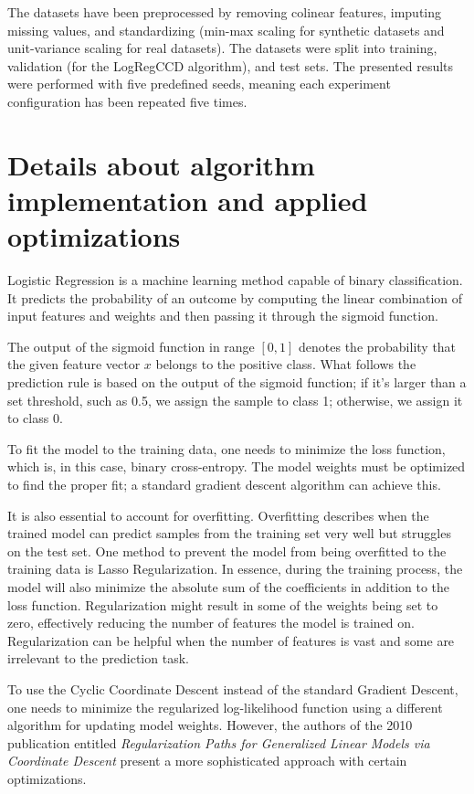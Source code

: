\documentclass[11pt]{article}
\begin{document}
The datasets have been preprocessed by removing colinear features, imputing missing values, and standardizing (min-max scaling for synthetic datasets and unit-variance scaling for real datasets). The datasets were split into training, validation (for the LogRegCCD algorithm), and test sets. The presented results were performed with five predefined seeds, meaning each experiment configuration has been repeated five times.


\section{Details about algorithm implementation and applied optimizations}

Logistic Regression is a machine learning method capable of binary classification. It predicts the probability of an outcome by computing the linear combination of input features and weights and then passing it through the sigmoid function.

The output of the sigmoid function in range $[0,1]$ denotes the probability that the given feature vector $x$ belongs to the positive class. What follows the prediction rule is based on the output of the sigmoid function; if it's larger than a set threshold, such as 0.5, we assign the sample to class 1; otherwise, we assign it to class 0.

To fit the model to the training data, one needs to minimize the loss function, which is, in this case, binary cross-entropy. The model weights must be optimized to find the proper fit; a standard gradient descent algorithm can achieve this.

It is also essential to account for overfitting. Overfitting describes when the trained model can predict samples from the training set very well but struggles on the test set. One method to prevent the model from being overfitted to the training data is Lasso Regularization. In essence, during the training process, the model will also minimize the absolute sum of the coefficients in addition to the loss function. Regularization might result in some of the weights being set to zero, effectively reducing the number of features the model is trained on. Regularization can be helpful when the number of features is vast and some are irrelevant to the prediction task.

To use the Cyclic Coordinate Descent instead of the standard Gradient Descent, one needs to minimize the regularized log-likelihood function using a different algorithm for updating model weights. However, the authors of the 2010 publication entitled \textit{Regularization Paths for Generalized Linear Models via Coordinate Descent} \cite{Friedman2010} present a more sophisticated approach with certain optimizations.
\end{document}
